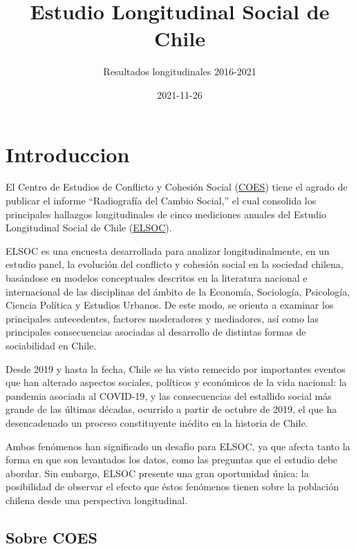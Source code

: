 \documentclass[
  12pt,
]{book}
\title{Estudio Longitudinal Social de Chile}
\subtitle{Resultados longitudinales 2016-2021}
\author{}
\date{\vspace{-2.5em}2021-11-26}
\begin{document}
\maketitle

{
\hypersetup{linkcolor=}
\setcounter{tocdepth}{1}
\tableofcontents
}
\listoftables
\listoffigures
{}
\hypertarget{introduccion}{%
\chapter{Introduccion}\label{introduccion}}

El Centro de Estudios de Conflicto y Cohesión Social (\href{https://coes.cl/}{COES}) tiene el agrado de publicar el informe ``Radiografía del Cambio Social,'' el cual consolida los principales hallazgos longitudinales de cinco mediciones anuales del Estudio Longitudinal Social de Chile (\href{https://coes.cl/encuesta-panel/}{ELSOC}).

ELSOC es una encuesta desarrollada para analizar longitudinalmente, en un estudio panel, la evolución del conflicto y cohesión social en la sociedad chilena, basándose en modelos conceptuales descritos en la literatura nacional e internacional de las disciplinas del ámbito de la Economía, Sociología, Psicología, Ciencia Política y Estudios Urbanos. De este modo, se orienta a examinar los principales antecedentes, factores moderadores y mediadores, así como las principales consecuencias asociadas al desarrollo de distintas formas de sociabilidad en Chile.

Desde 2019 y hasta la fecha, Chile se ha visto remecido por importantes eventos que han alterado aspectos sociales, políticos y económicos de la vida nacional: la pandemia asociada al COVID-19, y las consecuencias del estallido social más grande de las últimas décadas, ocurrido a partir de octubre de 2019, el que ha desencadenado un proceso constituyente inédito en la historia de Chile.

Ambos fenómenos han significado un desafío para ELSOC, ya que afecta tanto la forma en que son levantados los datos, como las preguntas que el estudio debe abordar. Sin embargo, ELSOC presente una gran oportunidad única: la posibilidad de observar el efecto que éstos fenómenos tienen sobre la población chilena desde una perspectiva longitudinal.

\hypertarget{sobre-coes}{%
\section{Sobre COES}\label{sobre-coes}}
\end{document}
